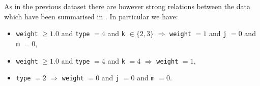 As in the previous dataset there are however strong relations between the data which have been summarised in .
In particular we have:
\begin{itemize}
  \item \texttt{weight} $\ge 1.0$ and \texttt{type} $= 4$ and \texttt{k} $\in \lbrace 2, 3 \rbrace$ $\Rightarrow$ \texttt{weight} $= 1$ and \texttt{j} $= 0$ and \texttt{m} $= 0$,

  \item \texttt{weight} $\ge 1.0$ and \texttt{type} $= 4$ and \texttt{k} $= 4$ $\Rightarrow$ \texttt{weight} $= 1$,

  \item \texttt{type} $= 2$ $\Rightarrow$ \texttt{weight} $= 0$ and \texttt{j} $= 0$ and \texttt{m} $= 0$.
\end{itemize}

